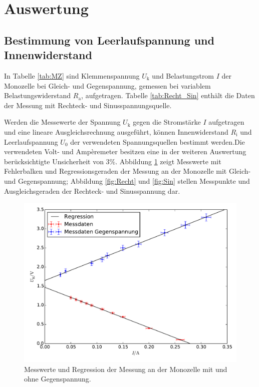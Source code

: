 \newpage
\section{Auswertung}
\label{sec:Auswertung}
\subsection{Bestimmung von Leerlaufspannung und Innenwiderstand}
In Tabelle \ref{tab:MZ} sind Klemmenspannung $U_\mathup{k}$ und Belastungstrom $I$ der Monozelle bei Gleich- und Gegenspannung, gemessen bei variablem Belastungswiderstand $R_\mathup{a}$, aufgetragen. Tabelle \ref{tab:Recht_Sin} enthält die Daten der Messung mit Rechteck- und Sinusspannungsquelle.



Werden die Messewerte der Spannung $U_\mathup{k}$ gegen die Stromstärke $I$ aufgetragen und eine lineare Ausgleichsrechnung ausgeführt,  können Innenwiderstand $R_\mathup{i}$ und Leerlaufspannung $U_0$ der verwendeten Spannungsquellen bestimmt werden.Die verwendeten Volt- und Ampèremeter besitzen eine in der weiteren Auswertung berücksichtigte  Unsicherheit von 3\%. Abbildung \ref{fig:MZ} zeigt Messwerte mit Fehlerbalken und Regressionsgeraden der Messung an der Monozelle mit Gleich- und Gegenspannung; Abbildung \ref{fig:Recht} und \ref{fig:Sin} stellen Messpunkte und Ausgleichsgeraden der Rechteck- und Sinusspannung dar.
\begin{figure}[h]
	\centering
	\label{fig:MZ}
	\includegraphics[width=\textwidth]{content/plot_MZ.pdf}
	\caption{Messwerte und Regression der Messung an der Monozelle mit und ohne Gegenspannung.}
\end{figure}
